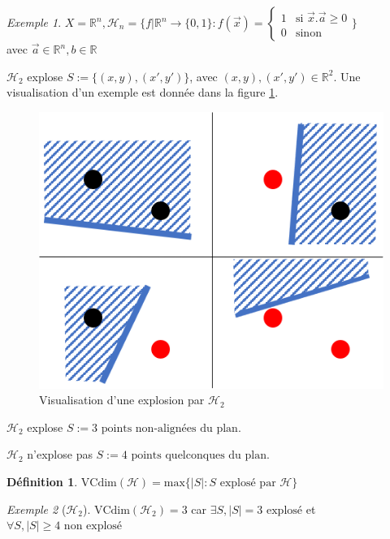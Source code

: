 \documentclass{article}
\theoremstyle{definition}
\newtheorem{definition}{Définition}[section]
\theoremstyle{remark}
\newtheorem*{example}{Exemple}
\begin{document}
\begin{example}
    $X=\mathbb{R}^n, \mathcal{H}_n = \{f | \mathbb{R}^n\to\{0,1\} : f(\vec{x})=
    \begin{cases}
            1 & \text{si } \vec{x}.\vec{a}\geq 0\\
            0 & \text{sinon}
    \end{cases}
    \}
    $\\
    avec $\vec{a}\in\mathbb{R}^n, b\in\mathbb{R}$
    
    $\mathcal{H}_2$ explose $S:=\{(x,y),(x',y')\}$, avec $(x,y), (x',y')\in\mathbb{R}^2$. Une visualisation d'un exemple est donnée dans la figure \ref{fig:cas2}.
    
    \begin{figure}[ht]
        \centering
        \includegraphics[]{img/h2.png}
        \caption{Visualisation d'une explosion par $\mathcal{H}_2$}
        \label{fig:cas2}
    \end{figure}
    
    $\mathcal{H}_2$ explose $S:=\mbox{3 points non-alignées du plan}$.
    
    $\mathcal{H}_2$ n'explose pas $S:=\mbox{4 points quelconques du plan}$.
\end{example}

\begin{definition}
    $\mbox{VCdim}(\mathcal{H}) = \mbox{max}\{|S|:S \mbox{ explosé par }\mathcal{H}\}$
\end{definition}

\begin{example}[$\mathcal{H}_2$]
    $\mbox{VCdim}(\mathcal{H}_2)=3$ car $\exists S, |S|=3 \mbox{ explosé}$ et $\forall S, |S|\geq 4 \mbox{ non explosé}$
\end{example}
\end{document}
